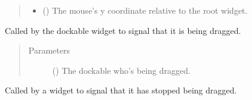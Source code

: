 \documentclass[letterpaper,10pt,english]{sphinxmanual}
\begin{document}
\begin{fulllineitems}
\begin{fulllineitems}
\begin{quote}
\begin{description}
\begin{itemize}
\item {} 
 () \textendash{} The mouse’s y coordinate relative to the root widget.

\end{itemize}

\end{description}\end{quote}

\end{fulllineitems}


\begin{fulllineitems}
\label{\detokenize{api:gui.core.Grid.signal_drag_start}}
Called by the  dockable widget to signal that it is being dragged.
\begin{quote}\begin{description}
\item[{Parameters}] \leavevmode
{} () \textendash{} The dockable who’s being dragged.

\end{description}\end{quote}

\end{fulllineitems}


\begin{fulllineitems}
\label{\detokenize{api:gui.core.Grid.signal_drag_stop}}
Called by a  widget to signal that it has stopped being dragged.

\end{fulllineitems}


\end{fulllineitems}

\end{document}

